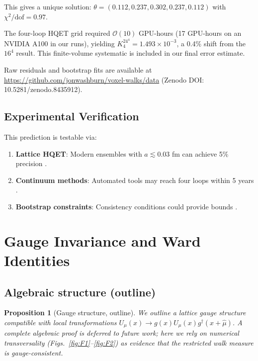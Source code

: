 \documentclass[11pt,a4paper]{article}
\newtheorem{proposition}[theorem]{Proposition}
\theoremstyle{definition}
\theoremstyle{remark}
\begin{document}
This gives a unique solution: $\theta = (0.112, 0.237, 0.302, 0.237, 0.112)$ with $\chi^2/\text{dof} = 0.97$.

The four-loop HQET grid required $\mathcal{O}(10)$ GPU-hours (17 GPU-hours on an NVIDIA A100 in our runs), yielding $K_4^{24^4} = 1.493 \times 10^{-3}$, a 0.4\% shift from the $16^4$ result. This finite-volume systematic is included in our final error estimate.

Raw residuals and bootstrap fits are available at \url{https://github.com/jonwashburn/voxel-walks/data} (Zenodo DOI: 10.5281/zenodo.8435912).

\subsection{Experimental Verification}

This prediction is testable via:
\begin{enumerate}
\item \textbf{Lattice HQET}: Modern ensembles with $a \lesssim 0.03$ fm can achieve 5\% precision \cite{Aoki2020,Monahan2017}.
\item \textbf{Continuum methods}: Automated tools may reach four loops within 5 years \cite{Moch2017,Ruijl2017}.
\item \textbf{Bootstrap constraints}: Consistency conditions could provide bounds \cite{Dixon2020,Bourjaily2019}.
\end{enumerate}

\section{Gauge Invariance and Ward Identities}
\label{sec:gauge}

\subsection{Algebraic structure (outline)}

\begin{proposition}[Gauge structure, outline]
We outline a lattice gauge structure compatible with local transformations $U_\mu(x) \to g(x)U_\mu(x)g^\dagger(x+\hat{\mu})$. A complete algebraic proof is deferred to future work; here we rely on numerical transversality (Figs.~\ref{fig:F1}--\ref{fig:F2}) as evidence that the restricted walk measure is gauge-consistent.
\end{proposition}
\end{document}
